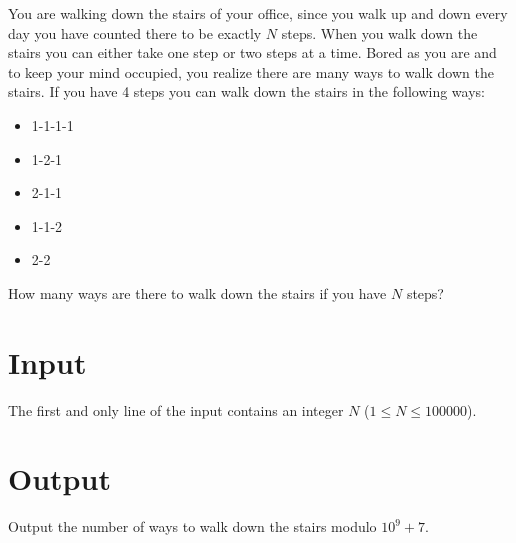 You are walking down the stairs of your office, since you walk up and down every day you have counted there to be
exactly \(N\) steps. When you walk down the stairs you can either take one step or two steps at a time.
Bored as you are and to keep your mind occupied, you realize there are many ways to walk down the stairs.
If you have 4 steps you can walk down the stairs in the following ways:
\begin{itemize}
\item 1-1-1-1
\item 1-2-1
\item 2-1-1
\item 1-1-2
\item 2-2
\end{itemize}

How many ways are there to walk down the stairs if you have \(N\) steps?

\section*{Input}
The first and only line of the input contains an integer \(N\) (\(1 \le N \le 100000\)).

\section*{Output}
Output the number of ways to walk down the stairs modulo \(10^9 + 7\).
